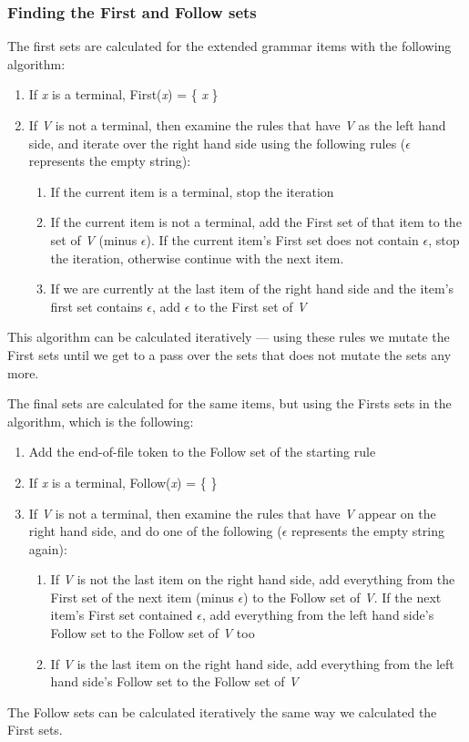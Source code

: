 \subsubsection{Finding the First and Follow sets} 
The first sets are calculated for the extended grammar items with the following algorithm:
\begin{enumerate}
\item If \textit{x} is a terminal, First(\textit{x}) = \{ \textit{x} \}
\item If \textit{V} is not a terminal, then examine the rules that have \textit{V} as the left hand side, and iterate over the right hand side using the following rules ($\epsilon$ represents the empty string):
\begin{enumerate}
\item If the current item is a terminal, stop the iteration
\item If the current item is not a terminal, add the First set of that item to the set of \textit{V} (minus $\epsilon$). If the current item's First set does not contain $\epsilon$, stop the iteration, otherwise continue with the next item.
\item If we are currently at the last item of the right hand side and the item's first set contains $\epsilon$, add $\epsilon$ to the First set of \textit{V}
\end{enumerate}
\end{enumerate}
This algorithm can be calculated iteratively --- using these rules we mutate the First sets until we get to a pass over the sets that does not mutate the sets any more.

The final sets are calculated for the same items, but using the Firsts sets in the algorithm, which is the following:
\begin{enumerate}
\item Add the end-of-file token to the Follow set of the starting rule
\item If \textit{x} is a terminal, Follow(\textit{x}) = \{ \}
\item If \textit{V} is not a terminal, then examine the rules that have \textit{V} appear on the right hand side, and do one of the following ($\epsilon$ represents the empty string again):
\begin{enumerate}
\item If \textit{V} is not the last item on the right hand side, add everything from the First set of the next item (minus $\epsilon$) to the Follow set of \textit{V}. If the next item's First set contained $\epsilon$, add everything from the left hand side's Follow set to the Follow set of \textit{V} too
\item If \textit{V} is the last item on the right hand side, add everything from the left hand side's Follow set to the Follow set of \textit{V}
\end{enumerate}
\end{enumerate}
The Follow sets can be calculated iteratively the same way we calculated the First sets.
